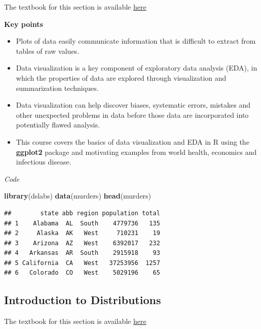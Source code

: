 \documentclass[
]{article}
\newenvironment{Shaded}{\begin{snugshade}}{\end{snugshade}}
\newcommand{\KeywordTok}[1]{\textcolor[rgb]{0.13,0.29,0.53}{\textbf{#1}}}
\newcommand{\NormalTok}[1]{#1}
\providecommand{\tightlist}{%
  \setlength{\itemsep}{0pt}\setlength{\parskip}{0pt}}
\begin{document}
The textbook for this section is available
\href{https://rafalab.github.io/dsbook/introduction-to-data-visualization.html}{here}

\textbf{Key points}

\begin{itemize}
\tightlist
\item
  Plots of data easily communicate information that is difficult to
  extract from tables of raw values.
\item
  Data visualization is a key component of exploratory data analysis
  (EDA), in which the properties of data are explored through
  visualization and summarization techniques.
\item
  Data visualization can help discover biases, systematic errors,
  mistakes and other unexpected problems in data before those data are
  incorporated into potentially flawed analysis.
\item
  This course covers the basics of data visualization and EDA in R using
  the \textbf{ggplot2} package and motivating examples from world
  health, economics and infectious disease.
\end{itemize}

\emph{Code}

\begin{Shaded}
\begin{Highlighting}[]
\KeywordTok{library}\NormalTok{(dslabs)}
\KeywordTok{data}\NormalTok{(murders)}
\KeywordTok{head}\NormalTok{(murders)}
\end{Highlighting}
\end{Shaded}

\begin{verbatim}
##        state abb region population total
## 1    Alabama  AL  South    4779736   135
## 2     Alaska  AK   West     710231    19
## 3    Arizona  AZ   West    6392017   232
## 4   Arkansas  AR  South    2915918    93
## 5 California  CA   West   37253956  1257
## 6   Colorado  CO   West    5029196    65
\end{verbatim}

\hypertarget{introduction-to-distributions}{%
\subsection{Introduction to
Distributions}\label{introduction-to-distributions}}

The textbook for this section is available
\href{https://rafalab.github.io/dsbook/distributions.html}{here}
\end{document}

